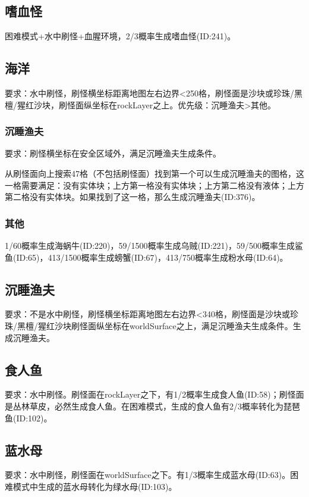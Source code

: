 \subsection{嗜血怪}
困难模式+水中刷怪+血腥环境，2/3概率生成嗜血怪(ID:241)。

\subsection{海洋}
要求：水中刷怪，刷怪横坐标距离地图左右边界<250格，刷怪面是沙块或珍珠/黑檀/猩红沙块，刷怪面纵坐标在rockLayer之上。优先级：沉睡渔夫>其他。

\subsubsection{沉睡渔夫}
要求：刷怪横坐标在安全区域外，满足沉睡渔夫生成条件。

从刷怪面向上搜索47格（不包括刷怪面）找到第一个可以生成沉睡渔夫的图格，这一格需要满足：没有实体块；上方第一格没有实体块；上方第二格没有液体；上方第二格没有实体块。如果找到了这一格，那么生成沉睡渔夫(ID:376)。

\subsubsection{其他}
1/60概率生成海蜗牛(ID:220)，59/1500概率生成乌贼(ID:221)，59/500概率生成鲨鱼(ID:65)，413/1500概率生成螃蟹(ID:67)，413/750概率生成粉水母(ID:64)。

\subsection{沉睡渔夫}
要求：不是水中刷怪，刷怪横坐标距离地图左右边界<340格，刷怪面是沙块或珍珠/黑檀/猩红沙块刷怪面纵坐标在worldSurface之上，满足沉睡渔夫生成条件。生成沉睡渔夫。

\subsection{食人鱼}
要求：水中刷怪。刷怪面在rockLayer之下，有1/2概率生成食人鱼(ID:58)；刷怪面是丛林草皮，必然生成食人鱼。在困难模式，生成的食人鱼有2/3概率转化为琵琶鱼(ID:102)。

\subsection{蓝水母}
要求：水中刷怪，刷怪面在worldSurface之下。有1/3概率生成蓝水母(ID:63)。困难模式中生成的蓝水母转化为绿水母(ID:103)。

